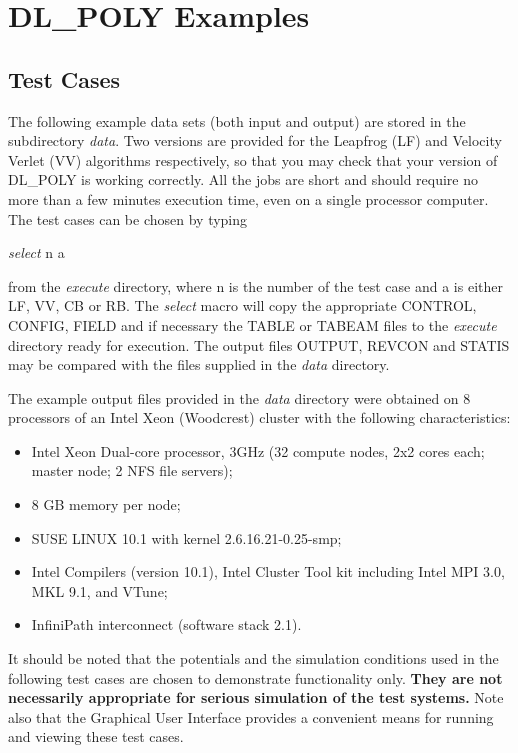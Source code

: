 \section{DL\_POLY Examples}

\subsection{Test Cases}

The following example data sets (both input and output) are stored in
the subdirectory {\em data}. Two versions are provided for the
Leapfrog (LF) and Velocity Verlet (VV) algorithms respectively,
so that you may check that your version of DL\_POLY is
working correctly.  All the jobs are short and should require no more
than a few minutes execution time, even on a single processor
computer. The test cases can be chosen by typing

{\sl select } n a

\noindent from the {\em execute} directory, where n is the number of the test
case and a is either LF, VV, CB or RB.  The {\sl select} macro will
copy the appropriate CONTROL, CONFIG, FIELD and if necessary the TABLE
or TABEAM files to the {\em execute} directory ready for execution.
The output files OUTPUT, REVCON and STATIS may be compared with the
files supplied in the {\em data} directory.

The example output files provided in the {\em data} directory were
obtained on 8 processors of an Intel Xeon (Woodcrest) cluster with the
following characteristics:
\begin{itemize}
\item Intel Xeon Dual-core processor, 3GHz (32 compute nodes, 2x2 cores each;
master node; 2 NFS file servers);
\item 8 GB memory per node;
\item SUSE LINUX 10.1 with kernel 2.6.16.21-0.25-smp;
\item Intel Compilers (version 10.1), Intel Cluster Tool kit including Intel
MPI 3.0, MKL 9.1, and VTune;
\item InfiniPath interconnect (software stack 2.1).
\end{itemize}

It should be noted that the potentials and the simulation conditions
used in the following test cases are chosen to demonstrate
functionality only.  {\bf They are not necessarily appropriate for serious
simulation of the test systems.}  Note also that the \D{} Graphical User
Interface \cite{smith-gui} provides a convenient means for running and
viewing these test cases.

